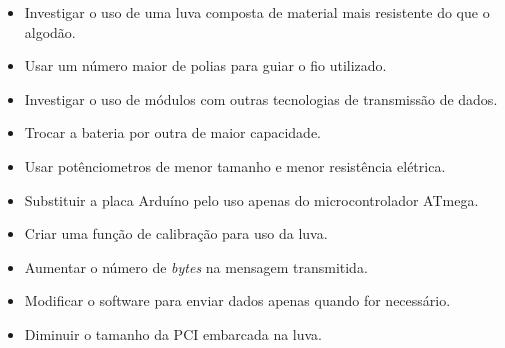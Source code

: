 \documentclass[
	12pt,				%
	openright,			%
	oneside,			%
	a4paper,			%
	english,			%
	brazil				%
	]{abntex2}
\begin{document}
		\begin{itemize}
			\item Investigar o uso de uma luva composta de material mais resistente do que o algodão.
			\item Usar um número maior de polias para guiar o fio utilizado.
			\item Investigar o uso de módulos com outras tecnologias de transmissão de dados.
			\item Trocar a bateria por outra de maior capacidade.
			\item Usar potênciometros de menor tamanho e menor resistência elétrica.
			\item Substituir a placa Arduíno pelo uso apenas do microcontrolador ATmega.
			\item Criar uma função de calibração para uso da luva.
			\item Aumentar o número de \textit{bytes} na mensagem transmitida.
			\item Modificar o software para enviar dados apenas quando for necessário.
			\item Diminuir o tamanho da PCI embarcada na luva.
		\end{itemize}
\end{document}
